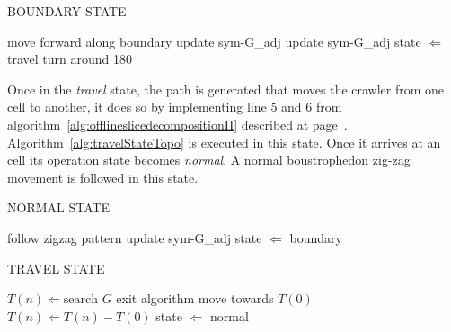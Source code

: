 \begin{RoyalAlgorithm}[label=alg:boundaryStateTopo]{BOUNDARY STATE}
    \begin{algorithmic}[1]
            \Loop
                \State move forward along boundary
                    \State update \gls{sym-G_adj}
                \EndIf
                    \State update \gls{sym-G_adj}
                        \State state $ \Leftarrow $ travel
                    \Else
                        \State turn around 180\textdegree
                    \EndIf
                \EndIf
            \EndLoop
        \EndProcedure
    \end{algorithmic}
\end{RoyalAlgorithm}

Once in the \emph{travel} state, the path is generated that moves the crawler from one cell to another, it does so by
implementing line 5 and 6 from algorithm~\ref{alg:offlineslicedecompositionII} described at
page~\pageref{alg:offlineslicedecompositionII}. Algorithm~\ref{alg:travelStateTopo} is executed in this state. Once it
arrives at an cell its operation state becomes \emph{normal}. A normal boustrophedon zig-zag movement is followed in
this state.

\begin{RoyalAlgorithm}[label=alg:normalStateTopo]{NORMAL STATE}
    \begin{algorithmic}[1]
            \Repeat
                \State follow zigzag pattern
            \State update \gls{sym-G_adj}
            \State state $ \Leftarrow $ boundary
        \EndProcedure
    \end{algorithmic}
\end{RoyalAlgorithm}

\begin{RoyalAlgorithm}[label=alg:travelStateTopo]{TRAVEL STATE}
    \begin{algorithmic}[1]
            \State $ T(n) \Leftarrow \text{search } G $
                \State exit algorithm
            \EndIf
                \State move towards $ T(0) $
                    $ T(n) \Leftarrow T(n) - { T(0) } $
                \EndIf
            \EndWhile
            \State state $ \Leftarrow $ normal
        \EndProcedure
    \end{algorithmic}
\end{RoyalAlgorithm}

